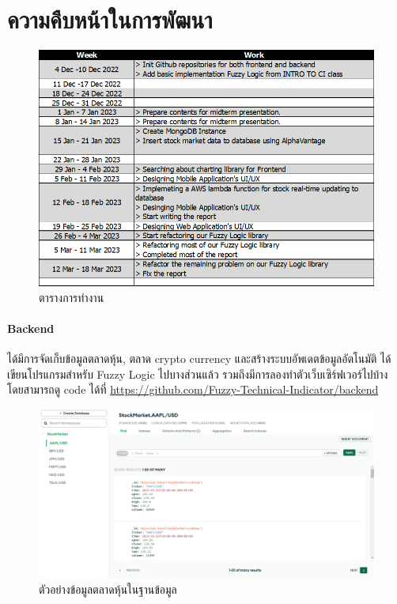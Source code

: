 \chapter{ความคืบหน้าในการพัฒนา}
\begin{figure}[ht]
    \centering
    \includegraphics[width=\textwidth]{images/works.png}
    \caption{ตารางการทำงาน}
\end{figure}
\subsubsection{Backend}
ได้มีการจัดเก็บข้อมูลตลาดหุ้น, ตลาด crypto currency และสร้างระบบอัพเดตข้อมูลอัตโนมัติ ได้เขียนโปรแกรมสำหรับ Fuzzy Logic ไปบางส่วนแล้ว
รวมถึงมีการลองทำตัวเว็บเซิร์ฟเวอร์ไปบ้าง โดยสามารถดู code ได้ที่ \url{https://github.com/Fuzzy-Technical-Indicator/backend}

\begin{figure}[ht]
    \centering
    \includegraphics[width=\textwidth]{images/db_example.png}
    \caption{ตัวอย่างข้อมูลตลาดหุ้นในฐานข้อมูล}
\end{figure}
\pagebreak

